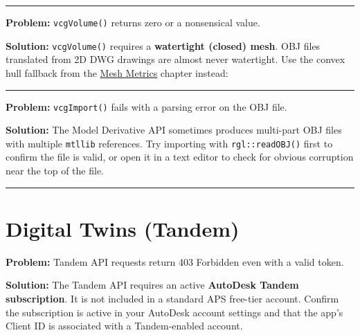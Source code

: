 \documentclass[
  11pt,
  letterpaper,
  DIV=11,
  numbers=noendperiod]{scrreprt}
\newenvironment{Shaded}{\begin{snugshade}}{\end{snugshade}}
\newcommand{\AttributeTok}[1]{\textcolor[rgb]{0.40,0.45,0.13}{#1}}
\newcommand{\CommentTok}[1]{\textcolor[rgb]{0.37,0.37,0.37}{#1}}
\newcommand{\DecValTok}[1]{\textcolor[rgb]{0.68,0.00,0.00}{#1}}
\newcommand{\FunctionTok}[1]{\textcolor[rgb]{0.28,0.35,0.67}{#1}}
\newcommand{\NormalTok}[1]{\textcolor[rgb]{0.00,0.23,0.31}{#1}}
\newcommand{\OtherTok}[1]{\textcolor[rgb]{0.00,0.23,0.31}{#1}}
\newcommand{\SpecialCharTok}[1]{\textcolor[rgb]{0.37,0.37,0.37}{#1}}
\newcommand{\StringTok}[1]{\textcolor[rgb]{0.13,0.47,0.30}{#1}}
\begin{document}
\begin{center}\rule{0.5\linewidth}{0.5pt}\end{center}

\textbf{Problem:} \texttt{vcgVolume()} returns zero or a nonsensical
value.

\textbf{Solution:} \texttt{vcgVolume()} requires a \textbf{watertight
(closed) mesh}. OBJ files translated from 2D DWG drawings are almost
never watertight. Use the convex hull fallback from the
\hyperref[mesh-metrics]{Mesh Metrics} chapter instead:

\begin{Shaded}
\end{Shaded}

\begin{center}\rule{0.5\linewidth}{0.5pt}\end{center}

\textbf{Problem:} \texttt{vcgImport()} fails with a parsing error on the
OBJ file.

\textbf{Solution:} The Model Derivative API sometimes produces
multi-part OBJ files with multiple \texttt{mtllib} references. Try
importing with \texttt{rgl::readOBJ()} first to confirm the file is
valid, or open it in a text editor to check for obvious corruption near
the top of the file.

\begin{center}\rule{0.5\linewidth}{0.5pt}\end{center}

\section{Digital Twins (Tandem)}\label{digital-twins-tandem}

\textbf{Problem:} Tandem API requests return 403 Forbidden even with a
valid token.

\textbf{Solution:} The Tandem API requires an active \textbf{AutoDesk
Tandem subscription}. It is not included in a standard APS free-tier
account. Confirm the subscription is active in your AutoDesk account
settings and that the app's Client ID is associated with a
Tandem-enabled account.
\end{document}

